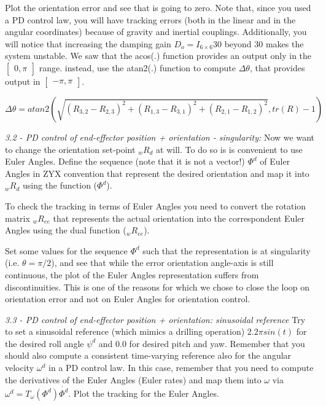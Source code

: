 \documentclass[11pt]{article}
\newcommand{\mat}[1]{\ensuremath{\begin{bmatrix}#1\end{bmatrix}}}	%
\begin{document}
Plot   the  orientation error and see that is going to zero.
 Note that, since you used a PD control law,  you will have tracking errors (both in the linear and in the angular  coordinates) because of gravity and inertial couplings. Additionally, you will notice that increasing the damping gain  $D_o = I_{6\times6}30$ beyond 30 makes the system unstable.
We saw that the acos(.) function provides an output only in the $\mat{ 0 , \pi}$ range. 
instead, use the atan2(.) function to compute  $\Delta \theta$, that provides output in $\mat{ -\pi   , \pi }$.

\begin{equation}
\Delta \theta = atan2\left(\sqrt{(R_{3,2} - R_{2,3})^2 + (R_{1,3} - R_{3,1})^2 + (R_{2,1} - R_{1,2})^2}, tr(R) -1\right)
\end{equation}

\quad

\noindent
\textit{3.2 - PD control of end-effector position + orientation - singularity:}
Now we want to change the orientation set-point  ${}_wR_{d}$ at will. To do so 
is is convenient to use Euler Angles. Define the sequence (note that it is not a vector!)  
$\Phi^d$ of Euler Angles in ZYX convention that represent the desired orientation 
and map it into ${}_wR_{d}$ using the function  ($\Phi^d$). 

To check the tracking in terms of Euler Angles you need to convert the rotation matrix ${}_wR_{ee}$ 
that represents the actual orientation  into the correspondent Euler Angles using the dual function (${}_wR_{ee}$).

Set some values for the sequence $\Phi^d$ such that the representation is at singularity (i.e. $\theta = \pi/2$), 
and see that while the error orientation angle-axis is still continuous, the 
plot of the Euler Angles representation suffers from discontinuities. 
This is one of the reasons for which we chose to close the loop on orientation error and not on Euler Angles for orientation control. 

\textit{3.3 - PD control of end-effector position + orientation: sinusoidal reference}
Try to set a sinusoidal reference (which mimics a drilling operation)  $ 2.2 \pi sin(t)$ for the desired roll angle $\psi^d$ and 0.0 for desired pitch and yaw. Remember that you should also compute a consistent time-varying reference also for the angular velocity $\omega^{d}$ in a PD control law. In this case, remember that you need to compute the derivatives of the Euler Angles (Euler rates) and map  them into $\omega$ via  $\omega^d = T_{\omega}(\Phi^d)\dot{\Phi^d}$. 
Plot the tracking for the Euler Angles.
\end{document}
